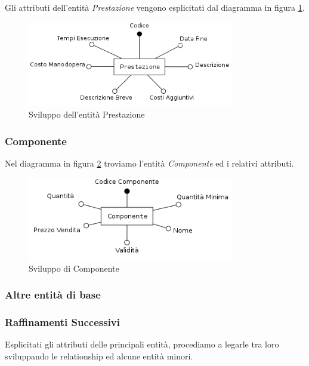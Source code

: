 			Gli attributi dell'entità \emph{Prestazione} vengono esplicitati dal diagramma in figura \ref{fig:prestazione}.
		
			\begin{figure}[H]
				\centering
				\includegraphics[width=9cm]{images/finitures/prestazione.png}
				\caption{Sviluppo dell'entità Prestazione}
				\label{fig:prestazione}
			\end{figure}
		
		\subsubsection{Componente}
			
			Nel diagramma in figura \ref{fig:componente} troviamo l'entità \emph{Componente} ed i relativi attributi.
			
			\begin{figure}[H]
				\centering
				\includegraphics[width=9cm]{images/finitures/componente.png}
				\caption{Sviluppo di Componente}
				\label{fig:componente}
			\end{figure}
		
		\subsubsection{Altre entità di base}
		
		\subsubsection{Raffinamenti Successivi}
			
			Esplicitati gli attributi delle principali entità, procediamo a legarle tra loro sviluppando le relationship ed alcune entità minori.
			
